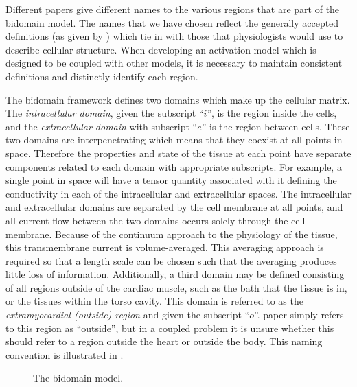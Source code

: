 Different papers give different names to the various regions that are part of
the bidomain model.  The names that we have chosen reflect the generally
accepted definitions (as given by ) which tie in
with those that physiologists would use to describe cellular structure.  When
developing an activation model which is designed to be coupled with other
models, it is necessary to maintain consistent definitions and distinctly
identify each region.

The bidomain framework defines two domains which make up the cellular matrix.
The \emph{intracellular domain}, given the subscript ``$i$'', is the region
inside the cells, and the \emph{extracellular domain} with subscript ``$e$''
is the region between cells.  These two domains are interpenetrating which
means that they coexist at all points in space.  Therefore the properties and
state of the tissue at each point have separate components related to each
domain with appropriate subscripts.  For example, a single point in space will
have a tensor quantity associated with it defining the conductivity in each of
the intracellular and extracellular spaces.  The intracellular and
extracellular domains are separated by the cell membrane at all points, and
all current flow between the two domains occurs solely through the cell
membrane.  Because of the continuum approach to the physiology of the tissue,
this transmembrane current is volume-averaged.  This averaging approach is
required so that a length scale can be chosen such that the averaging produces
little loss of information.  Additionally, a third domain may be defined
consisting of all regions outside of the cardiac muscle, such as the bath that
the tissue is in, or the tissues within the torso cavity.  This domain is
referred to as the \emph{extramyocardial (outside) region} and given the
subscript ``$o$''.   paper simply refers to
this region as ``outside'', but in a coupled problem it is unsure whether this
should refer to a region outside the heart or outside the body.  This naming
convention is illustrated in .
\begin{figure}[tb]
  \begin{center}
    \leavevmode
    
    \caption[The bidomain model]{The bidomain model.}
    \label{fig:bidomain-diagram}
  \end{center}
\end{figure}


